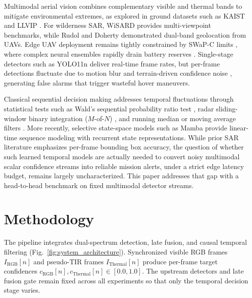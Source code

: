 \documentclass[conference]{IEEEtran}
\begin{document}
Multimodal aerial vision combines complementary visible and thermal bands to mitigate environmental extremes, as explored in ground datasets such as KAIST \cite{hwang2015multispectral} and LLVIP \cite{jia2021llvip}. For wilderness SAR, WiSARD \cite{broyles2022wisard} provides multi-viewpoint benchmarks, while Rudol and Doherty \cite{rudol2008human} demonstrated dual-band geolocation from UAVs. Edge UAV deployment remains tightly constrained by SWaP-C limits \cite{silvagni2017multipurpose}, where complex neural ensembles rapidly drain battery reserves \cite{lygouras2019unsupervised}. Single-stage detectors such as YOLO11n \cite{jocher2024yolo11} deliver real-time frame rates, but per-frame detections fluctuate due to motion blur and terrain-driven confidence noise \cite{portmann2014people}, generating false alarms that trigger wasteful hover maneuvers.

Classical sequential decision making addresses temporal fluctuations through statistical tests such as Wald's sequential probability ratio test \cite{wald1945sequential}, radar sliding-window binary integration ($M$-of-$N$) \cite{richards2014fundamentals}, and running median or moving average filters \cite{rabiner1975applications}. More recently, selective state-space models such as Mamba \cite{gu2023mamba} provide linear-time sequence modeling with recurrent state representations. While prior SAR literature emphasizes per-frame bounding box accuracy, the question of whether such learned temporal models are actually needed to convert noisy multimodal scalar confidence streams into reliable mission alerts, under a strict edge latency budget, remains largely uncharacterized. This paper addresses that gap with a head-to-head benchmark on fixed multimodal detector streams.

\section{Methodology}

The pipeline integrates dual-spectrum detection, late fusion, and causal temporal filtering (Fig.~\ref{fig:system_architecture}). Synchronized visible RGB frames $I_{\text{RGB}}[n]$ and pseudo-TIR frames $I_{\text{Thermal}}[n]$ produce per-frame target confidences $c_{\text{RGB}}[n], c_{\text{Thermal}}[n] \in [0.0, 1.0]$. The upstream detectors and late fusion gate remain fixed across all experiments so that only the temporal decision stage varies.
\end{document}
